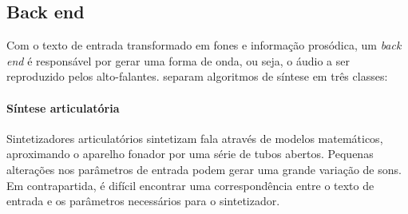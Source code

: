 

\subsection{Back end}
\label{backend}
Com o texto de entrada transformado em fones e informação prosódica, um
\emph{back end} é responsável por gerar uma forma de onda, ou seja, o áudio a
ser reproduzido pelos alto-falantes.  separam
algoritmos de síntese em três classes:

\paragraph{Síntese articulatória}
Sintetizadores articulatórios sintetizam fala através de modelos matemáticos,
aproximando o aparelho fonador por uma série de tubos abertos. Pequenas
alterações nos parâmetros de entrada podem gerar uma grande variação de sons. Em
contrapartida, é difícil encontrar uma correspondência entre o texto de entrada
e os parâmetros necessários para o sintetizador.

